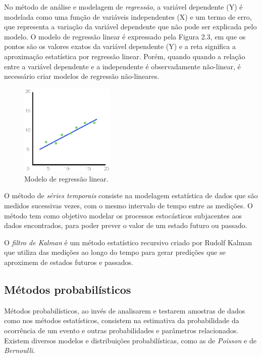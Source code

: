 No método de análise e modelagem de \textit{regressão}, a variável dependente (Y) é modelada como uma função de variáveis independentes (X) e um termo de erro, que representa a variação da variável dependente que não pode ser explicada pelo modelo. O modelo de regressão linear é expressado pela Figura 2.3, em que os pontos são os valores exatos da variável dependente (Y) e a reta significa a aproximação estatística por regressão linear. Porém, quando quando a relação entre a variável dependente e a independente é observadamente não-linear, é necessário criar modelos de regressão não-lineares.

\begin{figure}[htpb]
	\begin{center}
		\includegraphics[width=0.4\textwidth]{figuras/regressao-linear.eps}
		\caption{Modelo de regressão linear.}
	\end{center}
\end{figure}

O método de \textit{séries temporais} consiste na modelagem estatística de dados que são medidos sucessivas vezes, com o mesmo intervalo de tempo entre as medições. O método tem como objetivo modelar os processos estocásticos subjacentes aos dados encontrados, para poder prever o valor de um estado futuro ou passado.

O \textit{filtro de Kalman} é um método estatístico recursivo criado por Rudolf Kalman que utiliza das medições ao longo do tempo para gerar predições que se aproximem de estados futuros e passados.

\subsection{Métodos probabilísticos}

Métodos probabilísticos, ao invés de analisarem e testarem amostras de dados como nos métodos estatísticos, consistem na estimativa da probabilidade da ocorrência de um evento e outras probabilidades e parâmetros relacionados. Existem diversos modelos e distribuições probabilísticas, como as de \textit{Poisson} e de \textit{Bernoulli}.

